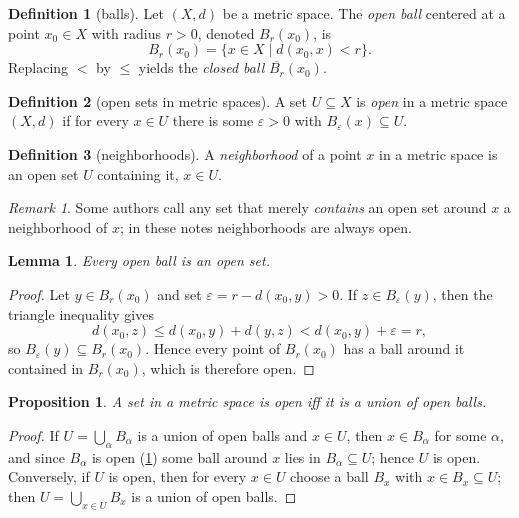 \documentclass[11pt]{article}
\newtheorem{lemma}{Lemma}[section]
\newtheorem{prop}{Proposition}[section]
\theoremstyle{definition}
\newtheorem{definition}{Definition}[section]
\theoremstyle{remark}
\newtheorem{remark}{Remark}[section]
\begin{document}
\begin{definition}[balls]
    Let $(X, d)$ be a metric space. The \emph{open ball} centered at a point $x_0 \in X$ with radius $r > 0$, denoted $B_r(x_0)$, is
    \[
    B_r(x_0) = \{x \in X \mid d(x_0, x) < r\}.
    \]
    Replacing $<$ by $\leq$ yields the \emph{closed ball} $\overline{B_r}(x_0)$.
\end{definition}

\begin{definition}[open sets in metric spaces]
    \label{metricopen}
    A set $U \subseteq X$ is \emph{open} in a metric space $(X, d)$ if for every $x \in U$ there is some $\varepsilon > 0$ with $B_\varepsilon(x) \subseteq U$.
\end{definition}

\begin{definition}[neighborhoods]
    A \emph{neighborhood} of a point $x$ in a metric space is an open set $U$ containing it, $x \in U$.
\end{definition}

\begin{remark}
    Some authors call any set that merely \emph{contains} an open set around $x$ a neighborhood of $x$; in these notes neighborhoods are always open.
\end{remark}

\begin{lemma}
    \label{ballsopen}
    Every open ball is an open set.
\end{lemma}

\begin{proof}
    Let $y \in B_r(x_0)$ and set $\varepsilon = r - d(x_0, y) > 0$. If $z \in B_\varepsilon(y)$, then the triangle inequality gives
    \[
    d(x_0, z) \leq d(x_0, y) + d(y, z) < d(x_0, y) + \varepsilon = r,
    \]
    so $B_\varepsilon(y) \subseteq B_r(x_0)$. Hence every point of $B_r(x_0)$ has a ball around it contained in $B_r(x_0)$, which is therefore open.
\end{proof}

\begin{prop}
    \label{unionballs}
    A set in a metric space is open iff it is a union of open balls.
\end{prop}

\begin{proof}
    If $U = \bigcup_\alpha B_\alpha$ is a union of open balls and $x \in U$, then $x \in B_\alpha$ for some $\alpha$, and since $B_\alpha$ is open (\cref{ballsopen}) some ball around $x$ lies in $B_\alpha \subseteq U$; hence $U$ is open. Conversely, if $U$ is open, then for every $x \in U$ choose a ball $B_x$ with $x \in B_x \subseteq U$; then $U = \bigcup_{x \in U} B_x$ is a union of open balls.
\end{proof}
\end{document}
